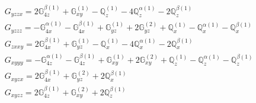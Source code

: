 \documentclass[fleqn,8pt,landscape]{jsarticle}
\begin{document}
\begin{align*}
& G_{yzzx} = 2 \mathbb{G}_{4z}^{\beta(1)} + \mathbb{G}_{xy}^{(1)} - \mathbb{Q}_{z}^{(1)} - 4 \mathbb{Q}_{z}^{\alpha(1)} - 2 \mathbb{Q}_{z}^{\beta(1)} \\
& G_{yzzz} = - \mathbb{G}_{4x}^{\alpha(1)} - \mathbb{G}_{4x}^{\beta(1)} + \mathbb{G}_{yz}^{(1)} + 2 \mathbb{G}_{yz}^{(2)} + \mathbb{Q}_{x}^{(1)} - \mathbb{Q}_{x}^{\alpha(1)} - \mathbb{Q}_{x}^{\beta(1)} \\
& G_{zxxy} = 2 \mathbb{G}_{4x}^{\beta(1)} + \mathbb{G}_{yz}^{(1)} - \mathbb{Q}_{x}^{(1)} - 4 \mathbb{Q}_{x}^{\alpha(1)} - 2 \mathbb{Q}_{x}^{\beta(1)} \\
& G_{xyyy} = - \mathbb{G}_{4z}^{\alpha(1)} - \mathbb{G}_{4z}^{\beta(1)} + \mathbb{G}_{xy}^{(1)} + 2 \mathbb{G}_{xy}^{(2)} + \mathbb{Q}_{z}^{(1)} - \mathbb{Q}_{z}^{\alpha(1)} - \mathbb{Q}_{z}^{\beta(1)} \\
& G_{xyzx} = 2 \mathbb{G}_{4x}^{\beta(1)} + \mathbb{G}_{yz}^{(2)} + 2 \mathbb{Q}_{x}^{\beta(1)} \\
& G_{xyzz} = 2 \mathbb{G}_{4z}^{\beta(1)} + \mathbb{G}_{xy}^{(2)} + 2 \mathbb{Q}_{z}^{\beta(1)}
\end{align*}
\end{document}

